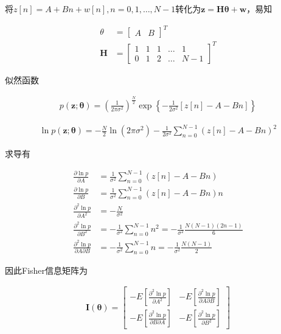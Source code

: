 \documentclass[fontset=windows]{article}
\numberwithin{figure}{section}
\begin{document}
将\(z[n]=A+Bn+w[n],n=0,1,…,N-1\)转化为\(\mathbf{z}=\mathbf{H}\boldsymbol{\theta}+\mathbf{w}\)，易知

\begin{align*}
	\theta     & =
	\begin{bmatrix}
		A & B
	\end{bmatrix}^T \\
	\mathbf{H} & =
	\begin{bmatrix}
		1 & 1 & 1 & … & 1   \\
		0 & 1 & 2 & … & N-1
	\end{bmatrix}^T
\end{align*}

似然函数

\begin{align*}
	p(\mathbf{z};\boldsymbol{\theta})=(\frac{1}{2\pi \sigma^2})^{\frac{N}{2}}
	\exp\left\{-\frac{1}{2\sigma^2}\left[z[n]-A-Bn\right]\right\}
\end{align*}

\begin{align*}
	\ln p(\mathbf{z};\boldsymbol{\theta})=-{\frac{N}{2}}\ln (2\pi \sigma^2)
	-\frac{1}{2\sigma^2}\sum_{n=0}^{N-1}\left(z[n]-A-Bn\right)^2
\end{align*}

求导有

\begin{align*}
	\frac{\partial \ln p}{\partial A}
	 & =\frac{1}{\sigma^2}\sum_{n=0}^{N-1}\left(z[n]-A-Bn\right)  \\
	\frac{\partial \ln p}{\partial B}
	 & =\frac{1}{\sigma^2}\sum_{n=0}^{N-1}\left(z[n]-A-Bn\right)n \\
	\frac{\partial^2 \ln p}{\partial A^2}
	 & =-\frac{N}{\sigma^2}                                       \\
	\frac{\partial^2 \ln p}{\partial B^2}
	 & =-\frac{1}{\sigma^2}\sum_{n=0}^{N-1}n^2
	=-\frac{1}{\sigma^2}\frac{N(N-1)(2n-1)}{6}                    \\
	\frac{\partial^2 \ln p}{\partial A \partial B}
	 & =-\frac{1}{\sigma^2}\sum_{n=0}^{N-1}n
	=-\frac{1}{\sigma^2}\frac{N(N-1)}{2}
\end{align*}

因此Fisher信息矩阵为

\begin{align*}
	\mathbf{I}(\boldsymbol{\theta})=
	\begin{bmatrix}
		-E[\frac{\partial^2 \ln p}{\partial A^2}]          & -E[\frac{\partial^2 \ln p}{\partial A\partial B}] \\
		-E[\frac{\partial^2 \ln p}{\partial B \partial A}] & -E[\frac{\partial^2 \ln p}{\partial B^2}]
	\end{bmatrix}
\end{align*}
\end{document}
